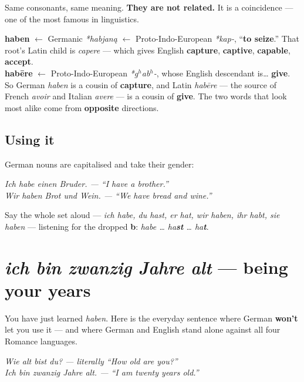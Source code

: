Same consonants, same meaning. \textbf{They are not related.} It is a
coincidence --- one of the most famous in linguistics.

\begin{cousinweb}
\textbf{haben} $\leftarrow$ Germanic \emph{*habjan\k{a}} $\leftarrow$
Proto-Indo-European \emph{*kap-}, ``\textbf{to seize}.'' That root's Latin child
is \emph{capere} --- which gives English \textbf{capture}, \textbf{captive},
\textbf{capable}, \textbf{accept}.\\[3pt]
\textbf{hab\=ere} $\leftarrow$ Proto-Indo-European \emph{*g\ensuremath{^h}ab\ensuremath{^h}-},
whose English descendant is\ldots{} \textbf{give}.\\[3pt]
So German \emph{haben} is a cousin of \textbf{capture}, and Latin \emph{hab\=ere}
--- the source of French \emph{avoir} and Italian \emph{avere} --- is a cousin of
\textbf{give}. The two words that look most alike come from \textbf{opposite}
directions.
\end{cousinweb}

\subsection*{Using it}

German nouns are capitalised and take their gender:

\begin{center}\itshape
Ich habe einen Bruder. --- ``I have a brother.''\\
Wir haben Brot und Wein. --- ``We have bread and wine.''
\end{center}

Say the whole set aloud --- \emph{ich habe, du hast, er hat, wir haben, ihr
habt, sie haben} --- listening for the dropped \textbf{b}: \emph{habe \ldots{}
ha\textbf{st} \ldots{} ha\textbf{t}}.

\section{\emph{ich bin zwanzig Jahre alt} --- being your years}
\label{lesson:alter}

You have just learned \emph{haben}. Here is the everyday sentence where German
\textbf{won't} let you use it --- and where German and English stand alone
against all four Romance languages.

\begin{center}\itshape
Wie alt bist du? --- literally ``How old are you?''\\
Ich bin zwanzig Jahre alt. --- ``I am twenty years old.''
\end{center}

